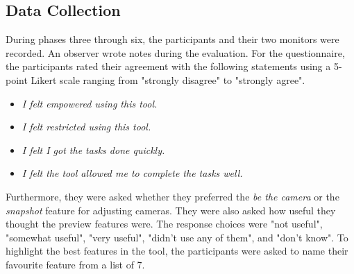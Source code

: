 \subsection{Data Collection}
During phases three through six, the participants and their two monitors were recorded. An observer wrote notes during the evaluation. For the questionnaire, the participants rated their agreement with the following statements using a 5-point Likert scale ranging from "strongly disagree" to "strongly agree". 

\begin{itemize}[noitemsep,nolistsep]
\item \textit{I felt empowered using this tool.}
\item \textit{I felt restricted using this tool.}
\item \textit{I felt I got the tasks done quickly.}
\item \textit{I felt the tool allowed me to complete the tasks well.}
\end{itemize}
Furthermore, they were asked whether they preferred the \textit{be the camera} or the \textit{snapshot} feature for adjusting cameras. They were also asked how useful they thought the preview features were. The response choices were "not useful", "somewhat useful", "very useful", "didn't use any of them", and "don't know". To highlight the best features in the tool, the participants were asked to name their favourite feature from a list of 7.
